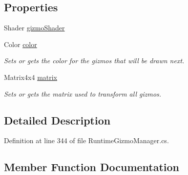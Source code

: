 \subsection*{Properties}
\begin{DoxyCompactItemize}
\item 
Shader \mbox{\hyperlink{class_leap_1_1_unity_1_1_runtime_gizmos_1_1_runtime_gizmo_drawer_a664625e49da1d01e3e4520cccc31247d}{gizmo\+Shader}}
\item 
Color \mbox{\hyperlink{class_leap_1_1_unity_1_1_runtime_gizmos_1_1_runtime_gizmo_drawer_abc3204be6b869c39d35876457ce8c9f0}{color}}
\begin{DoxyCompactList}\small\item\em Sets or gets the color for the gizmos that will be drawn next. \end{DoxyCompactList}\item 
Matrix4x4 \mbox{\hyperlink{class_leap_1_1_unity_1_1_runtime_gizmos_1_1_runtime_gizmo_drawer_a816acf5a1da53536a8d86d050ca213b6}{matrix}}
\begin{DoxyCompactList}\small\item\em Sets or gets the matrix used to transform all gizmos. \end{DoxyCompactList}\end{DoxyCompactItemize}


\subsection{Detailed Description}


Definition at line 344 of file Runtime\+Gizmo\+Manager.\+cs.



\subsection{Member Function Documentation}
\mbox{\label{class_leap_1_1_unity_1_1_runtime_gizmos_1_1_runtime_gizmo_drawer_aabd29ab232c427c79545ceaa2b35a609}} 
